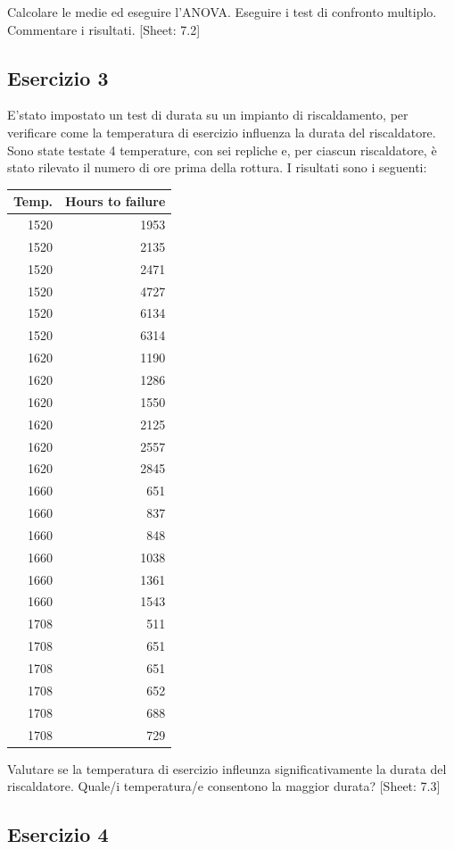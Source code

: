 \documentclass[a4paper,12pt,oneside]{book}
\begin{document}
Calcolare le medie ed eseguire l'ANOVA. Eseguire i test di confronto multiplo. Commentare i risultati.
{[}Sheet: 7.2{]}

\hypertarget{esercizio-3-5}{%
\subsection{Esercizio 3}\label{esercizio-3-5}}

E'stato impostato un test di durata su un impianto di riscaldamento, per verificare come la temperatura di esercizio influenza la durata del riscaldatore. Sono state testate 4 temperature, con sei repliche e, per ciascun riscaldatore, è stato rilevato il numero di ore prima della rottura. I risultati sono i seguenti:

\begin{longtable}[]{@{}rr@{}}
\toprule
Temp. & Hours to failure \\
\midrule
\endhead
1520 & 1953 \\
1520 & 2135 \\
1520 & 2471 \\
1520 & 4727 \\
1520 & 6134 \\
1520 & 6314 \\
1620 & 1190 \\
1620 & 1286 \\
1620 & 1550 \\
1620 & 2125 \\
1620 & 2557 \\
1620 & 2845 \\
1660 & 651 \\
1660 & 837 \\
1660 & 848 \\
1660 & 1038 \\
1660 & 1361 \\
1660 & 1543 \\
1708 & 511 \\
1708 & 651 \\
1708 & 651 \\
1708 & 652 \\
1708 & 688 \\
1708 & 729 \\
\bottomrule
\end{longtable}

Valutare se la temperatura di esercizio infleunza significativamente la durata del riscaldatore. Quale/i temperatura/e consentono la maggior durata?
{[}Sheet: 7.3{]}

\hypertarget{esercizio-4-5}{%
\subsection{Esercizio 4}\label{esercizio-4-5}}
\end{document}

